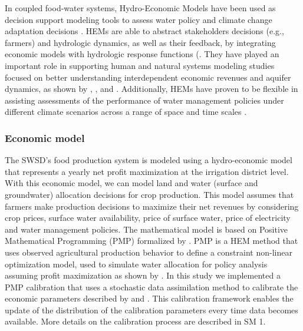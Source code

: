 \documentclass[a4paper,fleqn]{cas-sc}
\begin{document}
In coupled food-water systems, Hydro-Economic Models have been used as decision support modeling tools to assess water policy and climate change adaptation decisions \citep{ward_hydroeconomic_2021,harou_hydro-economic_2009}. HEMs are able to abstract stakeholders decisions (e.g., farmers) and hydrologic dynamics, as well as their feedback, by integrating economic models with hydrologic response functions (\citep{harou_hydro-economic_2009}. They have played an important role in supporting human and natural systems modeling studies focused on better understanding interdependent economic revenues and aquifer dynamics, as shown by \citet{macewan_hydroeconomic_2017}, \citet{afshar_multi-objective_2020}, \citet{graveline_combining_2020} and \citet{rodriguez-flores_global_2022}. Additionally, HEMs have proven to be flexible in assisting assessments of the performance of water management policies under different climate scenarios across a range of space and time scales \citep{partida_hydro-economic_2023}.

\subsubsection{Economic model}

The SWSD's food production system is modeled using a hydro-economic model \citep{harou_hydro-economic_2009} that represents a yearly net profit maximization at the irrigation district level. With this economic model, we can model land and water (surface and groundwater) allocation decisions for crop production. This model assumes that farmers make production decisions to maximize their net revenues by considering crop prices, surface water availability, price of surface water, price of electricity and water management policies. The mathematical model is based on Positive Mathematical Programming (PMP) formalized by \citet{howitt_calibration_1995}. PMP is a HEM method that uses observed agricultural production behavior to define a constraint non-linear optimization model, used to simulate water allocation for policy analysis assuming profit maximization as shown by \citet{graveline_combining_2020,macewan_hydroeconomic_2017,}. In this study we implemented a PMP calibration that uses a stochastic data assimilation method to calibrate the economic parameters described by \citet{maneta_stochastic_2014} and \citet{maneta_satellite-driven_2020}. This calibration framework enables the update of the distribution of the calibration parameters every time data becomes available. More details on the calibration process are described in SM 1. 
\end{document}
